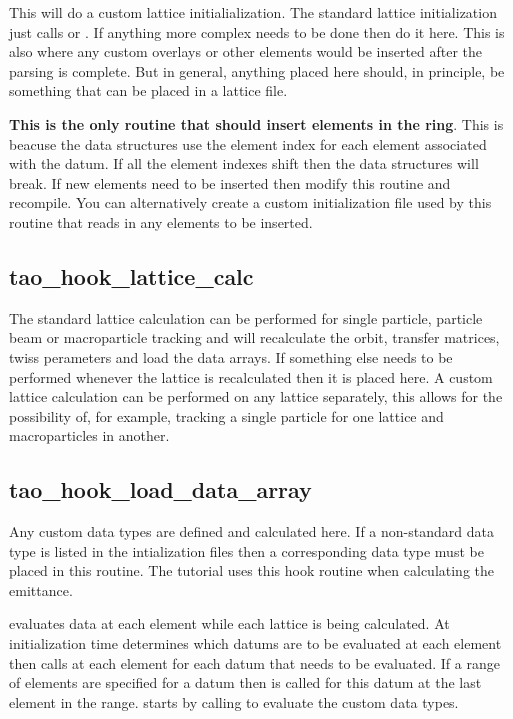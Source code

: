 This will do a custom lattice initialialization. The standard lattice
initialization just calls  or . If
anything more complex needs to be done then do it here. This is also
where any custom overlays or other elements would be inserted after
the parsing is complete. But in general, anything placed here should,
in principle, be something that can be placed in a lattice file.

\textbf{This is the only routine that should insert elements in the
ring}. This is beacuse the \tao data structures use the element index
for each element associated with the datum. If all the element indexes
shift then the data structures will break. If new elements need to be
inserted then modify this routine and recompile. You can alternatively
create a custom initialization file used by this routine that reads in
any elements to be inserted.

\subsection{tao\_hook\_lattice\_calc}

The standard lattice calculation can be performed for single particle,
particle beam or macroparticle tracking and will recalculate the
orbit, transfer matrices, twiss perameters and load the data
arrays. If something else needs to be performed whenever the lattice
is recalculated then it is placed here. A custom lattice calculation
can be performed on any lattice separately, this allows for the
possibility of, for example, tracking a single particle for one
lattice and macroparticles in another.

\subsection{tao\_hook\_load\_data\_array}

Any custom data types are defined and calculated here. If a
non-standard data type is listed in the intialization files then a
corresponding data type must be placed in this routine. The tutorial
uses this hook routine when calculating the emittance.

\tao evaluates data at each element while each lattice is being
calculated. At initialization time \tao determines which datums are to
be evaluated at each element then calls  at
each element for each datum that needs to be evaluated. If a range of
elements are specified for a datum then  is
called for this datum at the last element in the
range.  starts by calling
 to evaluate the custom data types.

